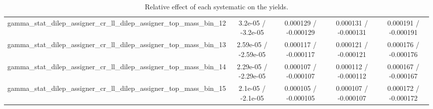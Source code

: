 \documentclass[10pt]{article}
\begin{document}
\begin{table}[htbp]
\begin{center}
\begin{tabular}{|c|c|c|c|c|}
  gamma_stat_dilep_assigner_cr_ll_dilep_assigner_top_mass_bin_12 & 3.2e-05 / -3.2e-05 & 0.000129 / -0.000129 & 0.000131 / -0.000131 & 0.000191 / -0.000191 \\ 
  gamma_stat_dilep_assigner_cr_ll_dilep_assigner_top_mass_bin_13 & 2.59e-05 / -2.59e-05 & 0.000117 / -0.000117 & 0.000121 / -0.000121 & 0.000176 / -0.000176 \\ 
  gamma_stat_dilep_assigner_cr_ll_dilep_assigner_top_mass_bin_14 & 2.29e-05 / -2.29e-05 & 0.000107 / -0.000107 & 0.000112 / -0.000112 & 0.000167 / -0.000167 \\ 
  gamma_stat_dilep_assigner_cr_ll_dilep_assigner_top_mass_bin_15 & 2.1e-05 / -2.1e-05 & 0.000105 / -0.000105 & 0.000107 / -0.000107 & 0.000172 / -0.000172 \\ 
\hline 
\end{tabular} 
\caption{Relative effect of each systematic on the yields.} 
\end{center} 
\end{table} 
\end{document}
